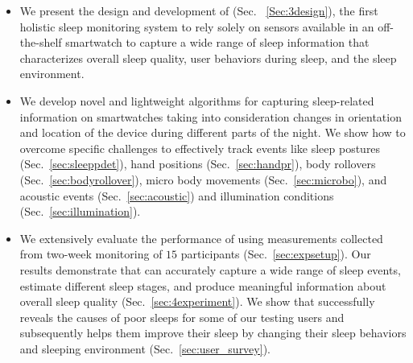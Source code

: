 \begin{itemize}
	\item We present the design and development of {\systemname} (Sec. ~\ref{Sec:3design}), the first holistic sleep monitoring system to rely solely on sensors available in an off-the-shelf smartwatch to capture a wide range of sleep information that characterizes overall sleep quality, user behaviors during sleep, and the sleep environment.
	
\item We develop novel and lightweight algorithms for capturing sleep-related information on smartwatches taking into consideration changes in orientation and location of the device during different parts of the night. We show how to overcome specific challenges to effectively track events like sleep postures (Sec.~\ref{sec:sleeppdet}), hand positions (Sec.~\ref{sec:handpr}), body rollovers (Sec.~\ref{sec:bodyrollover}), micro body movements (Sec.~\ref{sec:microbo}), and acoustic events (Sec.~\ref{sec:acoustic}) and illumination conditions (Sec.~\ref{sec:illumination}).
	

    \item We extensively evaluate the performance of {\systemname} using measurements collected from two-week monitoring of $15$ participants (Sec.~\ref{sec:expsetup}). Our results demonstrate that {\systemname} can accurately capture a wide range of sleep events, estimate different sleep stages, and produce meaningful information about overall sleep quality (Sec.~\ref{sec:4experiment}).  We show that {\systemname} successfully reveals the causes of poor sleeps for some of our testing users and subsequently helps them improve their sleep by changing their sleep behaviors and sleeping environment  (Sec.~\ref{sec:user_survey}).
\end{itemize}
